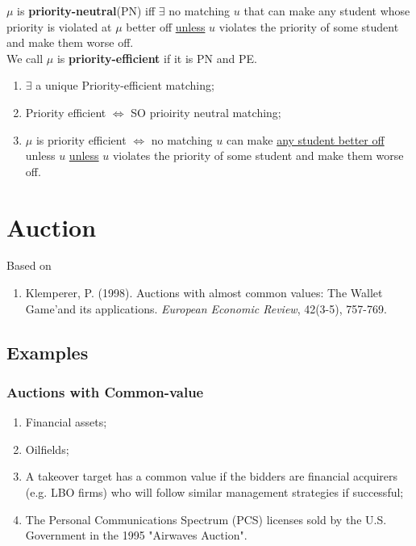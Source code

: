 \documentclass[11pt]{elegantbook}
\begin{document}
\begin{definition}
    \normalfont
    $\mu$ is \textbf{priority-neutral}(PN) iff $\exists$ no matching $u$ that can make any student whose priority is violated at $\mu$ better off \underline{unless} $u$ violates the priority of some student and make them worse off.\\
    We call $\mu$ is \textbf{priority-efficient} if it is PN and PE.
\end{definition}

\begin{theorem}
    \begin{enumerate}
        \item $\exists$ a unique Priority-efficient matching;
        \item Priority efficient $\Leftrightarrow$ SO prioirity neutral matching;
        \item $\mu$ is priority efficient $\Leftrightarrow$ no matching $u$ can make \underline{any student better off} unless $u$ \underline{unless} $u$ violates the priority of some student and make them worse off.
    \end{enumerate} 
\end{theorem}












\chapter{Auction}
Based on
\begin{enumerate}[$\circ$]
    \item Klemperer, P. (1998). Auctions with almost common values: The Wallet Game'and its applications. \textit{European Economic Review}, 42(3-5), 757-769.
\end{enumerate}


\section{Examples}
\subsection{Auctions with Common-value}
\begin{enumerate}[(1).]
    \item Financial assets;
    \item Oilfields;
    \item A takeover target has a common value if the bidders are financial acquirers (e.g. LBO firms) who will follow similar management strategies if successful;
    \item The Personal Communications Spectrum (PCS) licenses sold by the U.S. Government in the 1995 "Airwaves Auction".
\end{enumerate}
\end{document}
